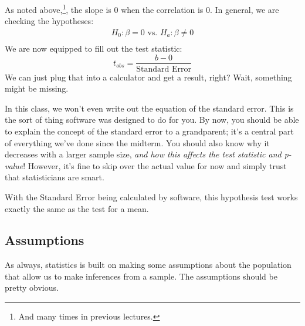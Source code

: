 \documentclass[
  letterpaper,
  DIV=11,
  numbers=noendperiod,
  oneside]{scrreprt}
\begin{document}
As noted above,\footnote{And many times in previous lectures.}, the
slope is 0 when the correlation is 0. In general, we are checking the
hypotheses: \begin{align*}
H_0: \beta = 0\text{ vs. }H_a: \beta\ne 0\\
\end{align*} We are now equipped to fill out the test statistic: \[
t_{obs} = \frac{b - 0}{\text{Standard Error}}
\] We can just plug that into a calculator and get a result, right?
Wait, something might be missing.

In this class, we won't even write out the equation of the standard
error. This is the sort of thing software was designed to do for you. By
now, you should be able to explain the concept of the standard error to
a grandparent; it's a central part of everything we've done since the
midterm. You should also know why it decreases with a larger sample
size, \emph{and how this affects the test statistic and p-value}!
However, it's fine to skip over the actual value for now and simply
trust that statisticians are smart.

With the Standard Error being calculated by software, this hypothesis
test works exactly the same as the test for a mean.

\hypertarget{assumptions-1}{%
\subsection{Assumptions}\label{assumptions-1}}

As always, statistics is built on making some assumptions about the
population that allow us to make inferences from a sample. The
assumptions should be pretty obvious.
\end{document}
